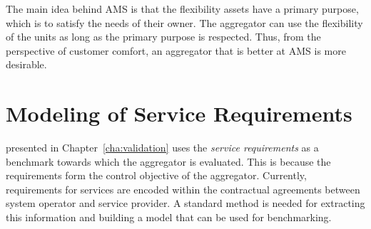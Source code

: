 The main idea behind AMS is that the flexibility assets have a primary purpose, which is to satisfy the needs of their owner. The aggregator can use the flexibility of the units as long as the primary purpose is respected. Thus, from the perspective of customer comfort, an aggregator that is better at AMS is more desirable. 
\section{Modeling of Service Requirements} %
\label{sec:modelingAS}
 presented in Chapter~\ref{cha:validation} uses the \emph{service requirements} as a benchmark towards which the aggregator is evaluated. This is because the requirements form the control objective of the aggregator. Currently, requirements for services are encoded within the contractual agreements between system operator and service provider. A standard method is needed for extracting this information and building a model that can be used for benchmarking.

